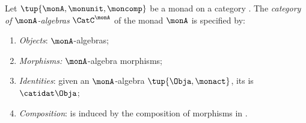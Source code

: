 \begin{ctdefinition}
    \label{def:catofmonadalgebras}
    Let $\tup{\monA, \monunit, \moncomp}$ be a monad on a category \CatC.
    The \emph{category of $\monA$-algebras} $\CatC^\monA$ of the monad $\monA$ is specified by:
    \begin{enumerate}
        \item \emph{Objects}: $\monA$-algebras;
        \item \emph{Morphisms:} $\monA$-algebra morphisms;
        \item \emph{Identities}: given an $\monA$-algebra $\tup{\Obja, \monact}$, its  is $\catidat\Obja$;
        \item \emph{Composition}: is induced by the composition of morphisms in \CatC.
    \end{enumerate}
\end{ctdefinition}


